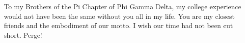 \cleardoublepage
\thispagestyle{empty} %

\vspace*{8cm}

\hfill
\begin{parbox}{0.6\textwidth}{
\begin{flushright}

To my Brothers of the Pi Chapter of Phi Gamma Delta, my college experience would not have been the same without you all in my life. You are my closest friends and the embodiment of our motto. I wish our time had not been cut short. Perge!

\end{flushright}}
\end{parbox}
